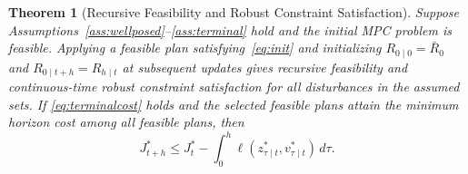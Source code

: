 \documentclass[11pt,a4paper]{article}
\numberwithin{equation}{section}
\newtheorem{theorem}{Theorem}
\theoremstyle{remark}\newtheorem{remark}{Remark}
\begin{document}
\begin{theorem}[Recursive Feasibility and Robust Constraint Satisfaction]\label{thm:mpc}
Suppose Assumptions~\ref{ass:wellposed}--\ref{ass:terminal} hold and the initial MPC problem is feasible. Applying a feasible plan satisfying~\eqref{eq:init} and initializing $R_{0\mid0}=\bar R_0$ and $R_{0\mid t+h}=R_{h\mid t}$ at subsequent updates gives recursive feasibility and continuous-time robust constraint satisfaction for all disturbances in the assumed sets. If \eqref{eq:terminalcost} holds and the selected feasible plans attain the minimum horizon cost among all feasible plans, then
\begin{equation}\label{eq:decrease}
J_{t+h}^*\le J_t^*-\int_0^h\ell(z_{\tau\mid t}^*,v_{\tau\mid t}^*)\,d\tau.
\end{equation}
\end{theorem}
\end{document}
